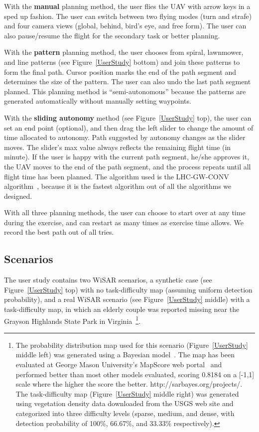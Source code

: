 With the \textbf{manual} planning method, the user flies the UAV with arrow keys in a sped up fashion. The user can switch between two flying modes (turn and strafe) and four camera views (global, behind, bird's eye, and free form). The user can also pause/resume the flight for the secondary task or better planning.

With the \textbf{pattern} planning method, the user chooses from spiral, lawnmower, and line patterns (see Figure~\ref{UserStudy} bottom) and join these patterns to form the final path. Cursor position marks the end of the path segment and determines the size of the pattern. The user can also undo the last path segment planned. This planning method is ``semi-autonomous'' because the patterns are generated automatically without manually setting waypoints.

With the \textbf{sliding autonomy} method (see Figure~\ref{UserStudy} top), the user can set an end point (optional), and then drag the left slider to change the amount of time allocated to autonomy. Path suggested by autonomy changes as the slider moves. The slider's max value always reflects the remaining flight time (in minute). If the user is happy with the current path segment, he/she approves it, the UAV moves to the end of the path segment, and the process repeats until all flight time has been planned. The algorithm used is the LHC-GW-CONV algorithm~\cite{Lin2009UAV, Lin2014Hierarchical}, because it is the fastest algorithm out of all the algorithms we designed.

With all three planning methods, the user can choose to start over at any time during the exercise, and can restart as many times as exercise time allows. We record the best path out of all tries.

\subsection{Scenarios}

The user study contains two WiSAR scenarios, a synthetic case (see Figure~\ref{UserStudy} top) with no task-difficulty map (assuming uniform detection probability), and a real WiSAR scenario (see Figure~\ref{UserStudy} middle) with a task-difficulty map, in which an elderly couple was reported missing near the Grayson Highlands State Park in Virginia~\cite{Koester2008Lost}\footnote{The probability distribution map used for this scenario (Figure~\ref{UserStudy} middle left) was generated using a Bayesian model~\cite{Lin2010Bayesian}. The map has been evaluated at George Mason University's MapScore web portal~\cite{Twardy2012MapScore} and performed better than most other models evaluated, scoring 0.8184 on a [-1,1] scale where the higher the score the better. http://sarbayes.org/projects/. The task-difficulty map (Figure~\ref{UserStudy} middle right) was generated using vegetation density data downloaded from the USGS web site and categorized into three difficulty levels (sparse, medium, and dense, with detection probability of 100\%, 66.67\%, and 33.33\% respectively).}.


